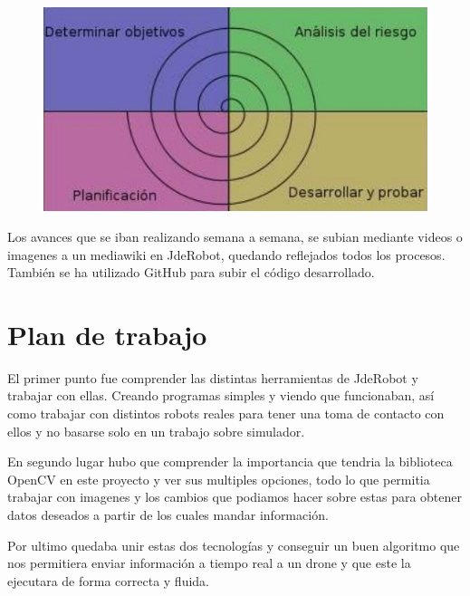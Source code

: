 \begin{figure}[H]
	\centering
		\includegraphics{imgs/metodologia-espiral.jpg}
	\label{fig:Desarrollo en espiral}
\end{figure}

\hspace{1 cm} Los avances que se iban realizando semana a semana, se subian mediante videos o imagenes a un mediawiki en JdeRobot, quedando reflejados todos los procesos. Tambi\'en se ha utilizado GitHub para subir el c\'odigo desarrollado.  

\section{Plan de trabajo}
\hspace{1 cm} El primer punto fue comprender las distintas herramientas de JdeRobot y trabajar con ellas. Creando programas simples y viendo que funcionaban, as\'i como trabajar con distintos robots reales para tener una toma de contacto con ellos y no basarse solo en un trabajo sobre simulador. 

\hspace{1 cm} En segundo lugar hubo que comprender la importancia que tendria la biblioteca OpenCV en este proyecto y ver sus multiples opciones, todo lo que permitia trabajar con imagenes y los cambios que podiamos hacer sobre estas para obtener datos deseados a partir de los cuales mandar informaci\'on. 

\hspace{1 cm} Por ultimo quedaba unir estas dos tecnolog\'ias y conseguir un buen algoritmo que nos permitiera enviar informaci\'on a tiempo real a un drone y que este la ejecutara de forma correcta y fluida.  




